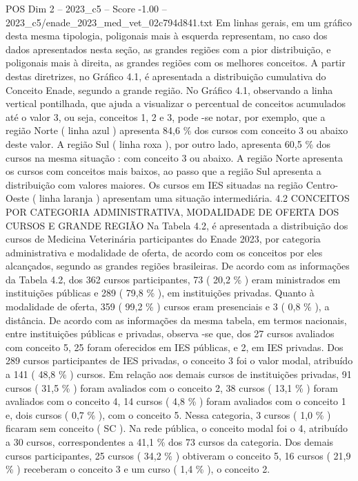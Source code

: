 \begin{textsample}{POS Dim 2 – 2023\_c5 – Score -1.00 – 2023\_c5/enade\_2023\_med\_vet\_02c794d841.txt}
Em linhas gerais, em um gráfico desta mesma tipologia, poligonais mais à esquerda representam, no caso dos dados apresentados nesta seção, as grandes regiões com a pior distribuição, e poligonais mais à direita, as grandes regiões com os melhores conceitos.
A partir destas diretrizes, no Gráfico 4.1, é apresentada a distribuição cumulativa do Conceito Enade, segundo a grande região.
No Gráfico 4.1, observando a linha vertical pontilhada, que ajuda a visualizar o percentual de conceitos acumulados até o valor 3, ou seja, conceitos 1, 2 e 3, pode -se notar, por exemplo, que a região Norte ( linha azul ) apresenta 84,6 \% dos cursos com conceito 3 ou abaixo deste valor.
A região Sul ( linha roxa ), por outro lado, apresenta 60,5 \% dos cursos na mesma situação : com conceito 3 ou abaixo.
A região Norte apresenta os cursos com conceitos mais baixos, ao passo que a região Sul apresenta a distribuição com valores maiores.
Os cursos em IES situadas na região Centro-Oeste ( linha laranja ) apresentam uma situação intermediária. 4.2 CONCEITOS POR CATEGORIA ADMINISTRATIVA, MODALIDADE DE OFERTA DOS CURSOS E GRANDE REGIÃO Na Tabela 4.2, é apresentada a distribuição dos cursos de Medicina Veterinária participantes do Enade 2023, por categoria administrativa e modalidade de oferta, de acordo com os conceitos por eles alcançados, segundo as grandes regiões brasileiras.
De acordo com as informações da Tabela 4.2, dos 362 cursos participantes, 73 ( 20,2 \% ) eram ministrados em instituições públicas e 289 ( 79,8 \% ), em instituições privadas.
Quanto à modalidade de oferta, 359 ( 99,2 \% ) cursos eram presenciais e 3 ( 0,8 \% ), a distância.
De acordo com as informações da mesma tabela, em termos nacionais, entre instituições públicas e privadas, observa -se que, dos 27 cursos avaliados com conceito 5, 25 foram oferecidos em IES públicas, e 2, em IES privadas.
Dos 289 cursos participantes de IES privadas, o conceito 3 foi o valor modal, atribuído a 141 ( 48,8 \% ) cursos.
Em relação aos demais cursos de instituições privadas, 91 cursos ( 31,5 \% ) foram avaliados com o conceito 2, 38 cursos ( 13,1 \% ) foram avaliados com o conceito 4, 14 cursos ( 4,8 \% ) foram avaliados com o conceito 1 e, dois cursos ( 0,7 \% ), com o conceito 5.
Nessa categoria, 3 cursos ( 1,0 \% ) ficaram sem conceito ( SC ).
Na rede pública, o conceito modal foi o 4, atribuído a 30 cursos, correspondentes a 41,1 \% dos 73 cursos da categoria.
Dos demais cursos participantes, 25 cursos ( 34,2 \% ) obtiveram o conceito 5, 16 cursos ( 21,9 \% ) receberam o conceito 3 e um curso ( 1,4 \% ), o conceito 2.

\end{textsample}
